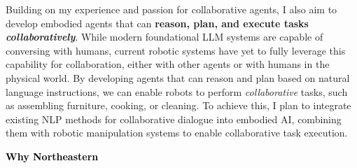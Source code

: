 \documentclass[10pt]{article}
\newcommand{\statement}[1]{\medskip\noindent
  \textcolor{black}{\textbf{#1}}\space
}
\begin{document}
\noindent Building on my experience and passion for collaborative agents, I also aim to develop embodied agents that can \textbf{reason, plan, and execute tasks \textit{collaboratively}}. While modern foundational LLM systems are capable of conversing with humans, current robotic systems have yet to fully leverage this capability for collaboration, either with other agents or with humans in the physical world. By developing agents that can reason and plan based on natural language instructions, we can enable robots to perform \textit{collaborative} tasks, such as assembling furniture, cooking, or cleaning. To achieve this, I plan to integrate existing NLP methods for collaborative dialogue into embodied AI, combining them with robotic manipulation systems to enable collaborative task execution.

\statement{Why Northeastern}
\end{document}
